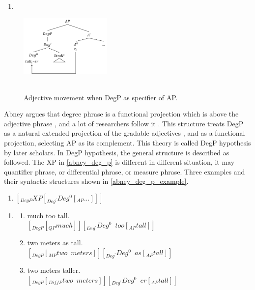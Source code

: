 \documentclass{ctexart}
\let \cite \parencite
\begin{document}
\begin{enumerate}
    \item \label{traditional_move}
\end{enumerate}

\begin{figure}[H]
    \centering
    \includegraphics[width=0.4\textwidth]{Pic/traditional_move.png}
    \begin{caption}
        \\ \vspace{-1.1ex}
        Adjective movement when DegP as specifier of AP.
    \end{caption}
\end{figure}

Abney argues that degree phrase is a functional projection which is above the adjective phrase \cite{abney1987}, and a lot of researchers follow it \cite{corver1993,zwarts1992}. This structure treats DegP as a natural extended projection of the gradable adjectives \cite{grimshaw2005}, and as a functional projection, selecting AP as its complement. This theory is called DegP hypothesis by later scholars. In DegP hypothesis, the general structure is described as followed. The XP in \ref{abney_deg_p} is different in different situation, it may quantifier phrase, or differential phrase, or measure phrase. Three examples and their syntactic structures shown in \ref{abney_deg_p_example}.

\begin{enumerate}
    \item \label{abney_deg_p} $[_{DegP} XP [_{Deg^{\prime}}Deg^0[_{AP}...]]] $
\end{enumerate}

\begin{enumerate}
    \item \label{abney_deg_p_example}
    \begin{enumerate}
        \item \label{abney_deg_p_example_1}
        much too tall.\\
        $[_{DegP} [_{QP} much]] [_{Deg^{\prime}}Deg^0 \enspace too [_{AP}tall]] $
        \item \label{abney_deg_p_example_2}
        two meters as tall.\\
        $[_{DegP} [_{MP} two \enspace meters]] [_{Deg^{\prime}}Deg^0 \enspace as [_{AP}tall]] $
        \item \label{abney_deg_p_example_3}
        two meters taller.\\
        $[_{DegP} [_{DiffP} two \enspace meters]] [_{Deg^{\prime}}Deg^0 \enspace er [_{AP}tall]] $

    \end{enumerate}
\end{enumerate}
\end{document}
